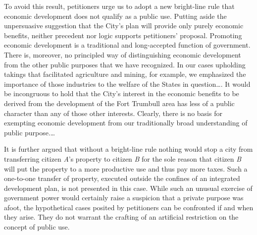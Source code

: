 To avoid this result, petitioners urge us to adopt a new bright-line rule that
economic development does not qualify as a public use. Putting aside the
unpersuasive suggestion that the City's plan will provide only purely economic
benefits, neither precedent nor logic supports petitioners' proposal. Promoting
economic development is a traditional and long-accepted function of government.
There is, moreover, no principled way of distinguishing economic development
from the other public purposes that we have recognized. In our cases upholding
takings that facilitated agriculture and mining, for example, we emphasized the
importance of those industries to the welfare of the States in question\ldots .
It would be incongruous to hold that the City's interest in the economic
benefits to be derived from the development of the Fort Trumbull area has less
of a public character than any of those other interests. Clearly, there is no
basis for exempting economic development from our traditionally broad
understanding of public purpose.\ldots


It is further argued that without a bright-line rule nothing would stop a city
from transferring citizen \textit{A}'s property to citizen \textit{B} for the
sole reason that citizen \textit{B} will put the property to a more productive
use and thus pay more taxes. Such a one-to-one transfer of property, executed
outside the confines of an integrated development plan, is not presented in this
case. While such an unusual exercise of government power would certainly raise a
suspicion that a private purpose was afoot, the hypothetical cases posited by
petitioners can be confronted if and when they arise. They do not warrant the
crafting of an artificial restriction on the concept of public use.


